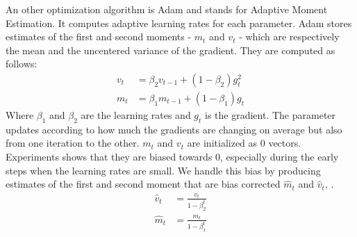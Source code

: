 An other optimization algorithm is Adam and stands for Adaptive Moment Estimation. It computes adaptive learning rates for each parameter. Adam stores estimates of the first and second moments - \(m_t\) and \(v_t\) - which are respectively the mean and the uncentered variance of the gradient. They are computed as follows:
\begin{subequations}
\begin{align}
v_t & = \beta_2 v_{t-1} + (1 - \beta_2)g_t^2 \\
m_t & = \beta_1 m_{t-1} + (1 - \beta_1)g_t
\end{align}
\end{subequations}
Where \(\beta_1\) and \(\beta_2\) are the learning rates and \(g_t\) is the gradient. The parameter updates according to how much the gradients are changing on average but also from one iteration to the other.  \(m_t\) and \(v_t\) are initialized as 0 vectors. Experiments shows that they are biased towards 0, especially during the early steps when the learning rates are small. We handle this bias by producing estimates of the first and second moment that are bias corrected \(\hat{m}_t\) and \(\hat{v}_t\), \cite{adam}.
\begin{subequations}
\begin{align}
\hat{v}_t &=  \frac{v_{t}}{1 - \beta_2^t} \\ 
\hat{m}_t &=  \frac{m_{t}}{1 - \beta_1^t}
\end{align}
\end{subequations}

